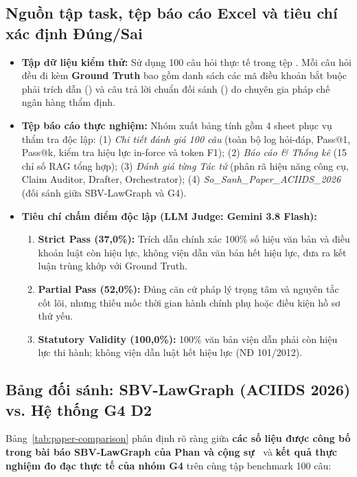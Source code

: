 \documentclass[10pt,a4paper]{article}
\begin{document}
\subsection{Nguồn tập task, tệp báo cáo Excel và tiêu chí xác định Đúng/Sai}
\begin{itemize}
  \item \textbf{Tập dữ liệu kiểm thử:} Sử dụng 100 câu hỏi thực tế trong tệp . Mỗi câu hỏi đều đi kèm \textbf{Ground Truth} bao gồm danh sách các mã điều khoản bắt buộc phải trích dẫn () và câu trả lời chuẩn đối sánh () do chuyên gia pháp chế ngân hàng thẩm định.
  \item \textbf{Tệp báo cáo thực nghiệm:} Nhóm xuất bảng tính  gồm 4 sheet phục vụ thẩm tra độc lập:
    (1) \emph{Chi tiết đánh giá 100 câu} (toàn bộ log hỏi-đáp, Pass@1, Pass@k, kiểm tra hiệu lực in-force và token F1);
    (2) \emph{Báo cáo \& Thống kê} (15 chỉ số RAG tổng hợp);
    (3) \emph{Đánh giá từng Tác tử} (phân rã hiệu năng công cụ, Claim Auditor, Drafter, Orchestrator);
    (4) \emph{So\_Sanh\_Paper\_ACIIDS\_2026} (đối sánh giữa SBV-LawGraph và G4).
  \item \textbf{Tiêu chí chấm điểm độc lập (LLM Judge: Gemini 3.8 Flash):}
    \begin{enumerate}
      \item \textbf{Strict Pass (37{,}0\%):} Trích dẫn chính xác 100\% số hiệu văn bản và điều khoản luật còn hiệu lực, không viện dẫn văn bản hết hiệu lực, đưa ra kết luận trùng khớp với Ground Truth.
      \item \textbf{Partial Pass (52{,}0\%):} Đúng căn cứ pháp lý trọng tâm và nguyên tắc cốt lõi, nhưng thiếu mốc thời gian hành chính phụ hoặc điều kiện hồ sơ thứ yếu.
      \item \textbf{Statutory Validity (100{,}0\%):} 100\% văn bản viện dẫn phải còn hiệu lực thi hành; không viện dẫn luật hết hiệu lực (NĐ 101/2012).
    \end{enumerate}
\end{itemize}

\subsection{Bảng đối sánh: SBV-LawGraph (ACIIDS 2026) vs. Hệ thống G4 D2}
Bảng~\ref{tab:paper-comparison} phân định rõ ràng giữa \textbf{các số liệu được công bố trong bài báo SBV-LawGraph của Phan và cộng sự~\cite{phan2026sbvlawgraph}} và \textbf{kết quả thực nghiệm đo đạc thực tế của nhóm G4} trên cùng tập benchmark 100 câu:
\end{document}
